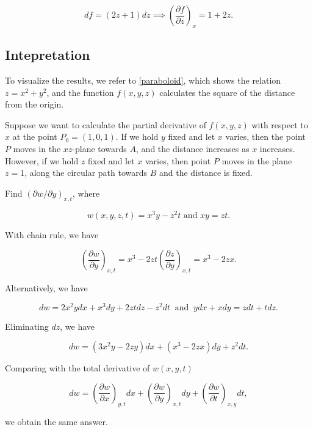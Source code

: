 \documentclass[english,a4paper,12pt]{report}
\begin{document}
\begin{equation}
	df = (2z+1)dz \implies \left( \frac{\partial f}{\partial z} \right)_{x} = 1+2z.
\end{equation}


\subsection{Intepretation}

To visualize the results, we refer to \cref{paraboloid}, which shows the relation \(z = x^2+y^2\), and the function \(f(x,y,z)\) calculates the square of the distance from the origin. 

Suppose we want to calculate the partial derivative of \(f(x,y,z)\) with respect to \(x\) at the point \(P_0 = (1,0,1)\). If we hold \(y\) fixed and let \(x\) varies, then the point \(P\) moves in the \(xz\)-plane towards \(A\), and the distance increases as \(x\) increases. However, if we hold \(z\) fixed and let \(x\) varies, then point \(P\) moves in the plane \(z = 1\), along the circular path towards \(B\) and the distance is fixed.   




{Find \( \left( \partial w / \partial y  \right)_{x,t} \), where 

\begin{equation}
	w(x,y,z,t) = x^3 y-z^2t \text { and } xy = zt.
\end{equation}
}
{With chain rule, we have

\begin{equation}
	\left( \frac{\partial w}{\partial y}  \right)_{x,t} = x^3 -2zt \left( \frac{\partial z}{\partial y}  \right)_{x,t} = x^3 - 2zx.  
\end{equation}

Alternatively, we have

\begin{equation}
	dw = 2x^2ydx+x^3 dy+2zt dz-z^2dt ~\text { and }~ ydx+xdy=zdt+tdz.
\end{equation}

Eliminating \(dz\), we have 

\begin{equation}
	dw = (3x^2y-2zy)dx + (x^3 - 2zx)dy+z^2dt. 
\end{equation}

Comparing with the total derivative of \(w(x,y,t)\) 

\begin{equation}
	dw = \left( \frac{\partial w}{\partial x}  \right)_{y,t} dx + \left( \frac{\partial w}{\partial y}  \right)_{x,t} dy +  \left( \frac{\partial w}{\partial t}  \right)_{x,y} dt ,  
\end{equation}

we obtain the same answer.
} 
\end{document}
